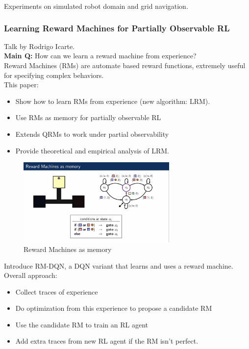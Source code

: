 Experiments on simulated robot domain and grid navigation.

\subsubsection{Learning Reward Machines for Partially Observable RL \cite{icarte2019learning}}

Talk by Rodrigo Icarte. \\

{\bf Main Q:} How can we learn a reward machine from experience? \\

Reward Machines (RMs) are automate based reward functions, extremely useful for specifying complex behaviors. \\


This paper:
\begin{itemize}
    \item Show how to learn RMs from experience (new algorithm: LRM).
    \item Use RMs as memory for partially observable RL
    \item Extends QRMs to work under partial observability
    \item Provide theoretical and empirical analysis of LRM.
\end{itemize}

\begin{figure}[h!]
    \centering
    \includegraphics[width=0.7\textwidth]{figures/rm.png}
    \caption{Reward Machines as memory}
    \label{fig:rm}
\end{figure}

Introduce RM-DQN, a DQN variant that learns and uses a reward machine. \\

Overall approach:
\begin{itemize}
    \item Collect traces of experience
    \item Do optimization from this experience to propose a candidate RM
    \item Use the candidate RM to train an RL agent
    \item Add extra traces from new RL agent if the RM isn't perfect.
\end{itemize}

\spacerule